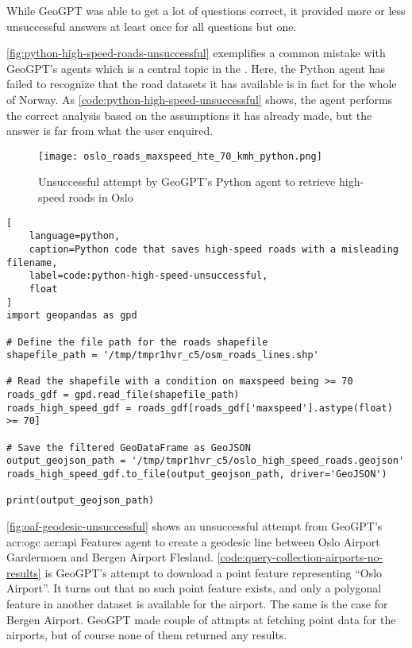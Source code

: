 While GeoGPT was able to get a lot of questions correct, it provided more or less unsuccessful answers at least once for all questions but one.

\autoref{fig:python-high-speed-roads-unsuccessful} exemplifies a common mistake with GeoGPT's agents which is a central topic in the . Here, the Python agent has failed to recognize that the road datasets it has available is in fact for the whole of Norway. As \autoref{code:python-high-speed-unsuccessful} shows, the agent performs the correct analysis based on the assumptions it has already made, but the answer is far from what the user enquired.

\begin{figure}[htbp]
    \centering
    \texttt{[image: oslo\_roads\_maxspeed\_hte\_70\_kmh\_python.png]}
    \caption{Unsuccessful attempt by GeoGPT's Python agent to retrieve high-speed roads in Oslo}
    \label{fig:python-high-speed-roads-unsuccessful}
\end{figure}

\FloatBarrier

\begin{lstlisting}[
    language=python,
    caption=Python code that saves high-speed roads with a misleading filename,
    label=code:python-high-speed-unsuccessful,
    float
]
import geopandas as gpd

# Define the file path for the roads shapefile
shapefile_path = '/tmp/tmpr1hvr_c5/osm_roads_lines.shp'

# Read the shapefile with a condition on maxspeed being >= 70
roads_gdf = gpd.read_file(shapefile_path)
roads_high_speed_gdf = roads_gdf[roads_gdf['maxspeed'].astype(float) >= 70]

# Save the filtered GeoDataFrame as GeoJSON
output_geojson_path = '/tmp/tmpr1hvr_c5/oslo_high_speed_roads.geojson'
roads_high_speed_gdf.to_file(output_geojson_path, driver='GeoJSON')

print(output_geojson_path)
\end{lstlisting}

\FloatBarrier

\autoref{fig:oaf-geodesic-unsuccessful} shows an unsuccessful attempt from GeoGPT's \acrshort{acr:ogc} \acrshort{acr:api} Features agent to create a geodesic line between Oslo Airport Gardermoen and Bergen Airport Flesland. \autoref{code:query-collection-airports-no-results} is GeoGPT's attempt to download a point feature representing \enquote{Oslo Airport}. It turns out that no such point feature exists, and only a polygonal feature in another dataset is available for the airport. The same is the case for Bergen Airport. GeoGPT made couple of attmpts at fetching point data for the airports, but of course none of them  returned any results.


